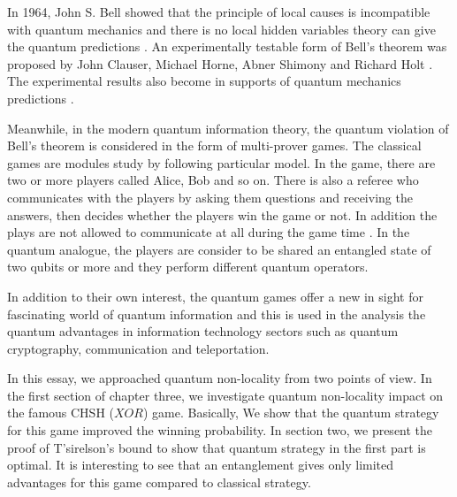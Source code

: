 In 1964, John S. Bell showed that the principle of local causes is incompatible with quantum mechanics and there is no local hidden variables theory can give the quantum predictions \citep*{book:800289}. An experimentally testable form of Bell's theorem was proposed by John Clauser, Michael Horne, Abner Shimony and Richard Holt \citep*{PhysRevLett.23.880}. The experimental results also become in supports of quantum mechanics predictions \citep{rowe2001experimental,PhysRevLett.28.938,PhysRevLett.49.1804,PhysRevLett.81.5039}.

Meanwhile, in the  modern quantum information theory, the quantum  violation of Bell's theorem is considered in the form of multi-prover games. The classical games are modules study by following particular model. In the game, there are two or more players called Alice, Bob and so on. There is also a referee who communicates with the players by asking them questions and receiving  the answers, then decides whether the players win the game or not. In addition the plays are not allowed to communicate at all during the game time \citep*{CHALLET1997407}. In the quantum analogue, the players are consider to be shared an entangled state of two qubits or more  and they perform different quantum operators.

In addition to their own interest, the quantum games offer a new in sight for fascinating world of quantum information  \citep*{PhysRevLett.82.1052} and this is used in the analysis the quantum advantages in information technology sectors such as quantum cryptography, communication and teleportation.


In this essay, we approached quantum non-locality from two points of view. In the first section of chapter three, we investigate quantum  non-locality  impact on the famous CHSH ($XOR$) game.  Basically, We show  that the quantum strategy for this game improved the winning probability. In section two, we present the proof of T'sirelson's bound \citep*{Cirel'son1980} to show that quantum strategy in the first part is optimal. It is interesting to see that an entanglement gives only limited advantages for this game compared to classical strategy.

